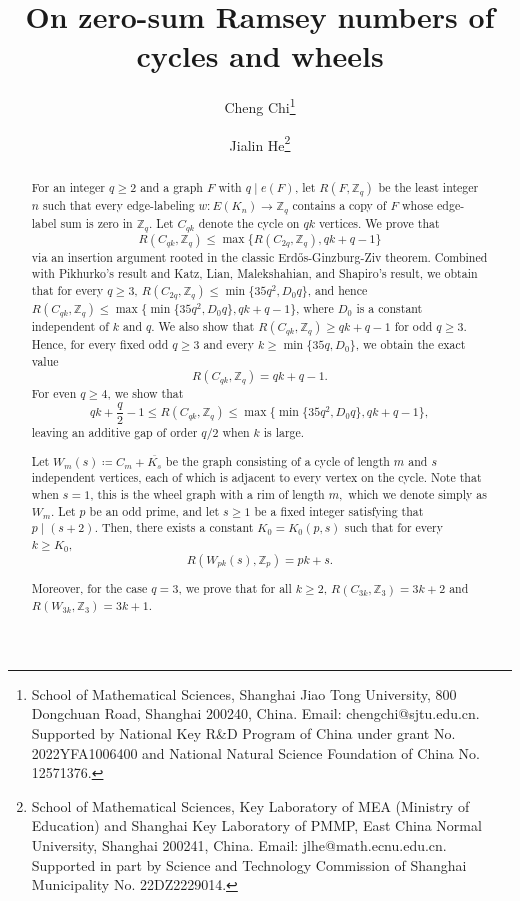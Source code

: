 \documentclass[11pt]{article}
\theoremstyle{remark}
\newcommand{\Z}{\mathbb Z}
\begin{document}
\title{On zero-sum Ramsey numbers of cycles and wheels}
\author{Cheng Chi\footnote{School of Mathematical Sciences, Shanghai Jiao Tong University, 800 Dongchuan Road, Shanghai 200240, China.
        Email: chengchi@sjtu.edu.cn.
        Supported by National Key R\&D Program of China under grant No. 2022YFA1006400 and National Natural Science Foundation of China No. 12571376.}
    \and Jialin He\footnote{School of Mathematical Sciences,  Key Laboratory of MEA (Ministry of Education) and Shanghai Key Laboratory of PMMP,  East China Normal University, Shanghai 200241, China.
        Email: jlhe@math.ecnu.edu.cn.
        Supported in part by Science and Technology Commission of Shanghai Municipality No. 22DZ2229014.}}
\date{}

\maketitle

\begin{abstract}
    For an integer $q\ge 2$ and a graph $F$ with $q\mid e(F)$, let $R(F,\Z_q)$ be the least integer $n$ such that every edge-labeling
    $w\colon E(K_n)\to \Z_q$ contains a copy of $F$ whose edge-label sum is zero in $\Z_q$.
    Let $C_{qk}$ denote the cycle on $qk$ vertices.
    We prove that
    \[
        R(C_{qk},\Z_q)\le \max\{R(C_{2q},\Z_q),qk+q-1\}
    \]
    via an insertion argument rooted in the classic Erd\H{o}s-Ginzburg-Ziv theorem.
    Combined with Pikhurko's result and Katz, Lian, Malekshahian, and Shapiro's result, we obtain that for every $q\ge 3$,
    $R(C_{2q},\Z_q)\le \min\{35q^2,D_0q\}$, and hence
    $R(C_{qk},\Z_q)\le \max\{\min\{35q^2,D_0q\},qk+q-1\}$, where $D_0$ is a constant independent of $k$ and $q$.
    We also show that $R(C_{qk},\Z_q)\ge qk+q-1$ for odd $q\ge 3$.
    Hence, for every fixed odd $q\ge 3$ and every $k\ge \min\{35q,D_0\}$, we obtain the exact value
    \[
        R(C_{qk},\Z_q)=qk+q-1.
    \]
    For even $q\ge 4$, we show that
    \[qk+\frac q2-1\le R(C_{qk},\Z_q)\le \max\{\min\{35q^2,D_0q\},qk+q-1\},
    \]
    leaving an additive gap of order $q/2$ when $k$ is large.

    Let \(W_m(s)\coloneqq C_m + \overline{K_s}\) be the graph consisting of a cycle of length $m$ and $s$ independent vertices, each of which is adjacent to every vertex on the cycle.
    Note that when $s=1$, this is the wheel graph with a rim of length $m,$ which we denote simply as $W_m.$
    Let $p$ be an odd prime, and let $s\ge1$ be a fixed integer satisfying that $p\mid (s+2).$
    Then, there exists a constant $K_0=K_0(p,s)$ such that for every $k\ge K_0,$
    \[R(W_{pk}(s), \Z_p)=pk+s.\]

    Moreover, for the case $q=3$, we prove that for all \(k \ge 2\), \(R(C_{3k}, \mathbb{Z}_3) = 3k + 2\) and \(R(W_{3k}, \mathbb{Z}_3) = 3k + 1\).
\end{abstract}
\end{document}
